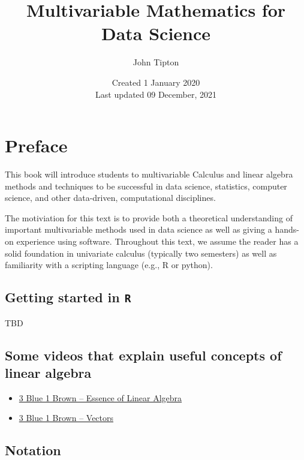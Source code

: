 \documentclass[
]{book}
\title{Multivariable Mathematics for Data Science}
\author{John Tipton}
\date{Created 1 January 2020\\
Last updated 09 December, 2021}
\theoremstyle{definition}
\theoremstyle{definition}
\theoremstyle{definition}
\theoremstyle{definition}
\theoremstyle{remark}
\begin{document}
\maketitle

{
\setcounter{tocdepth}{1}
\tableofcontents
}
\hypertarget{preface}{%
\chapter{Preface}\label{preface}}

This book will introduce students to multivariable Calculus and linear algebra methods and techniques to be successful in data science, statistics, computer science, and other data-driven, computational disciplines.

The motiviation for this text is to provide both a theoretical understanding of important multivariable methods used in data science as well as giving a hands-on experience using software. Throughout this text, we assume the reader has a solid foundation in univariate calculus (typically two semesters) as well as familiarity with a scripting language (e.g., R or python).

\hypertarget{getting-started-in-r}{%
\section{\texorpdfstring{Getting started in \texttt{R}}{Getting started in R}}\label{getting-started-in-r}}

TBD

\hypertarget{some-videos-that-explain-useful-concepts-of-linear-algebra}{%
\section{Some videos that explain useful concepts of linear algebra}\label{some-videos-that-explain-useful-concepts-of-linear-algebra}}

\begin{itemize}
\item
  \href{https://www.3blue1brown.com/lessons/eola-preview}{3 Blue 1 Brown -- Essence of Linear Algebra}
\item
  \href{https://www.3blue1brown.com/lessons/vectors}{3 Blue 1 Brown -- Vectors}
\end{itemize}

\hypertarget{notation}{%
\section{Notation}\label{notation}}
\end{document}

